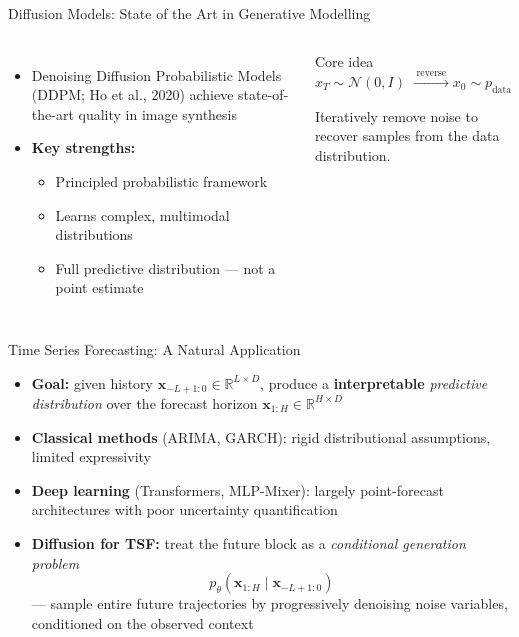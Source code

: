 \documentclass[aspectratio=169,11pt]{beamer}
\begin{document}
\begin{frame}{Diffusion Models: State of the Art in Generative Modelling}
  \begin{columns}[T]
      \begin{itemize}
        \setlength\itemsep{10pt}
        \item Denoising Diffusion Probabilistic Models (DDPM;
              Ho et al., 2020) achieve state-of-the-art quality
              in image synthesis
        \item \textbf{Key strengths:}
          \begin{itemize}
            \item Principled probabilistic framework
            \item Learns complex, multimodal distributions
            \item Full predictive distribution — not a point estimate
          \end{itemize}
      \end{itemize}
      \begin{block}{Core idea}
        \centering
        $x_T\!\sim\!\mathcal{N}(0,I)
         \;\xrightarrow{\;\text{reverse}\;}
         x_0\!\sim\! p_{\mathrm{data}}$
        \vspace{5pt}

        {\footnotesize Iteratively remove noise to recover
        samples from the data distribution.}
      \end{block}
  \end{columns}
\end{frame}

\begin{frame}{Time Series Forecasting: A Natural Application}
  \begin{itemize}
    \setlength\itemsep{9pt}
    \item \textbf{Goal:} given history
          $\mathbf{x}_{-L+1:0}\!\in\!\mathbb{R}^{L\times D}$,
          produce a \textbf{interpretable} \emph{predictive distribution} over the
          forecast horizon
          $\mathbf{x}_{1:H}\!\in\!\mathbb{R}^{H\times D}$

    \item \textbf{Classical methods} (ARIMA, GARCH): rigid distributional
          assumptions, limited expressivity

    \item \textbf{Deep learning} (Transformers, MLP-Mixer): largely
          point-forecast architectures with poor uncertainty quantification

    \item \textbf{Diffusion for TSF:} treat the future block as a
          \emph{conditional generation problem}
          \[
            p_\theta(\mathbf{x}_{1:H}\mid\mathbf{x}_{-L+1:0})
          \]
          — sample entire future trajectories by progressively denoising
          noise variables, conditioned on the observed context
  \end{itemize}
\end{frame}
\end{document}
